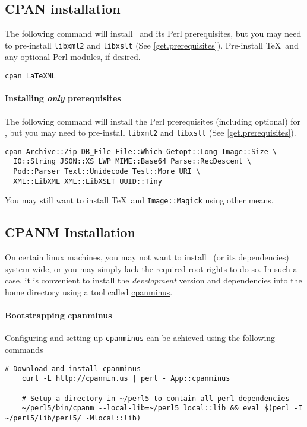 \documentclass{article}
\begin{document}
\subsection{CPAN installation}\label{get.cpan}
The following command will install \LaTeXML\ and its Perl prerequisites,
but you may need to pre-install \texttt{libxml2} and  \texttt{libxslt} (See \ref{get.prerequisites}).
Pre-install \TeX\ and any optional Perl modules, if desired.
\begin{lstlisting}[style=shell]
cpan LaTeXML
\end{lstlisting}

\paragraph*{Installing \emph{only}  prerequisites}\label{get.cpan.prereq}
The following command will install the Perl prerequisites (including optional)
for \LaTeXML, but you may need to pre-install \texttt{libxml2} and  \texttt{libxslt} (See \ref{get.prerequisites}).
\begin{lstlisting}[style=shell]
cpan Archive::Zip DB_File File::Which Getopt::Long Image::Size \
  IO::String JSON::XS LWP MIME::Base64 Parse::RecDescent \
  Pod::Parser Text::Unidecode Test::More URI \
  XML::LibXML XML::LibXSLT UUID::Tiny
\end{lstlisting}
You may still want to install \TeX\ and \texttt{Image::Magick}
using other means.

\subsection{CPANM Installation}\label{get.cpanm}
On certain linux machines, you may not want to install \LaTeXML\ (or its dependencies)
system-wide, or you may simply lack the required root rights to do so. 
In such a case, it is convenient to install the \emph{development} version and 
dependencies into the home directory using a tool called 
\href{ https://github.com/miyagawa/cpanminus}{cpanminus}.

\paragraph*{Bootstrapping cpanminus} Configuring and setting up \texttt{cpanminus} can be achieved using the following commands
\begin{lstlisting}[style=shell]
    # Download and install cpanminus
    curl -L http://cpanmin.us | perl - App::cpanminus
    
    # Setup a directory in ~/perl5 to contain all perl dependencies
    ~/perl5/bin/cpanm --local-lib=~/perl5 local::lib && eval $(perl -I ~/perl5/lib/perl5/ -Mlocal::lib)
\end{lstlisting}
\end{document}
